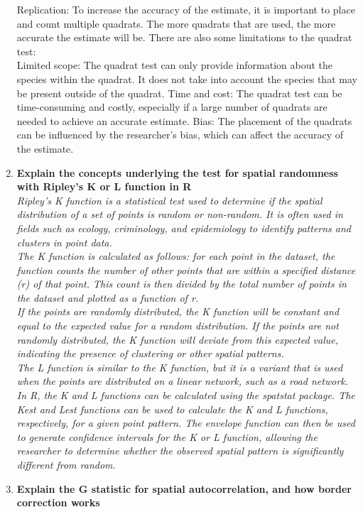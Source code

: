 \documentclass{article}
\begin{document}
\begin{enumerate}
{    Replication: To increase the accuracy of the estimate, it is important to place and count multiple quadrats. The more quadrats that are used, the more accurate the estimate will be.
    There are also some limitations to the quadrat test:\\
    Limited scope: The quadrat test can only provide information about the species within the quadrat. It does not take into account the species that may be present outside of the quadrat.
    Time and cost: The quadrat test can be time-consuming and costly, especially if a large number of quadrats are needed to achieve an accurate estimate.
    Bias: The placement of the quadrats can be influenced by the researcher's bias, which can affect the accuracy of the estimate.}
    \item \textbf{Explain the concepts underlying the test for spatial randomness with Ripley's K or L function in R} \\
    \textit{Ripley's K function is a statistical test used to determine if the spatial distribution of a set of points is random or non-random. It is often used in fields such as ecology, criminology, and epidemiology to identify patterns and clusters in point data.\\
    The K function is calculated as follows: for each point in the dataset, the function counts the number of other points that are within a specified distance (r) of that point. This count is then divided by the total number of points in the dataset and plotted as a function of r.\\
    If the points are randomly distributed, the K function will be constant and equal to the expected value for a random distribution. If the points are not randomly distributed, the K function will deviate from this expected value, indicating the presence of clustering or other spatial patterns.\\
    The L function is similar to the K function, but it is a variant that is used when the points are distributed on a linear network, such as a road network.\\
    In R, the K and L functions can be calculated using the spatstat package. The Kest and Lest functions can be used to calculate the K and L functions, respectively, for a given point pattern. The envelope function can then be used to generate confidence intervals for the K or L function, allowing the researcher to determine whether the observed spatial pattern is significantly different from random.}
    \item \textbf{Explain the G statistic for spatial autocorrelation, and how border correction works} \\

\end{enumerate}
\end{document}
